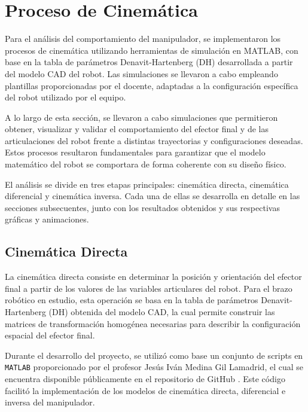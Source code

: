 \section{Proceso de Cinemática} \label{sec:proceso_cinematica}

Para el análisis del comportamiento del manipulador, se implementaron los procesos de cinemática utilizando herramientas de simulación en MATLAB, con base en la tabla de parámetros Denavit-Hartenberg (DH) desarrollada a partir del modelo CAD del robot.
Las simulaciones se llevaron a cabo empleando plantillas proporcionadas por el docente, adaptadas a la configuración específica del robot utilizado por el equipo.

A lo largo de esta sección, se llevaron a cabo simulaciones que permitieron obtener, visualizar y validar el comportamiento del efector final y de las articulaciones del robot frente a distintas trayectorias y configuraciones deseadas. Estos procesos resultaron fundamentales para garantizar que el modelo matemático del robot se comportara de forma coherente con su diseño físico.

El análisis se divide en tres etapas principales: cinemática directa, cinemática diferencial y cinemática inversa. Cada una de ellas se desarrolla en detalle en las secciones subsecuentes, junto con los resultados obtenidos y sus respectivas gráficas y animaciones.

\subsection{Cinemática Directa} \label{subsec:cinematica_directa}

La cinemática directa consiste en determinar la posición y orientación del efector final a partir de los valores de las variables articulares del robot. Para el brazo robótico en estudio, esta operación se basa en la tabla de parámetros Denavit-Hartenberg (DH) obtenida del modelo CAD, la cual permite construir las matrices de transformación homogénea necesarias para describir la configuración espacial del efector final.

Durante el desarrollo del proyecto, se utilizó como base un conjunto de scripts en \texttt{MATLAB} proporcionado por el profesor Jesús Iván Medina Gil Lamadrid, el cual se encuentra disponible públicamente en el repositorio de GitHub \cite{medinagl_robotica}. Este código facilitó la implementación de los modelos de cinemática directa, diferencial e inversa del manipulador.
 \\

